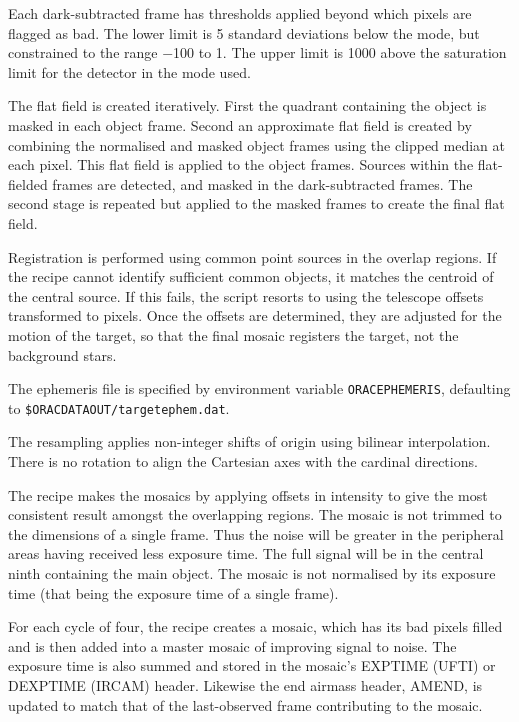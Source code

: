 \documentclass[twoside,11pt]{article}
\renewcommand{\_}{\texttt{\symbol{95}}}
\newcommand{\sstitem}{\item}
\begin{document}
{{{         \sstitem
         Each dark-subtracted frame has thresholds applied beyond which
         pixels are flagged as bad.  The lower limit is 5 standard
         deviations below the mode, but constrained to the range $-$100 to 1.
         The upper limit is 1000 above the saturation limit for the detector
         in the mode used.

         \sstitem
         The flat field is created iteratively.  First the quadrant
         containing the object is masked in each object frame.  Second an
         approximate flat field is created by combining the normalised
         and masked object frames using the clipped median at each pixel.
         This flat field is applied to the object frames.  Sources within
         the flat-fielded frames are detected, and masked in the
         dark-subtracted frames.  The second stage is repeated but applied
         to the masked frames to create the final flat field.

         \sstitem
         Registration is performed using common point sources in the
         overlap regions.  If the recipe cannot identify sufficient common
         objects, it matches the centroid of the central source.  If this
         fails, the script resorts to using the telescope offsets
         transformed to pixels.  Once the offsets are determined, they
         are adjusted for the motion of the target, so that the final
         mosaic registers the target, not the background stars.

         \sstitem
         The ephemeris file is specified by environment variable
         {\tt{ORAC\_EPHEMERIS}}, defaulting to {\tt\$ORAC\_DATA\_OUT/target\_ephem.dat}.

         \sstitem
         The resampling applies non-integer shifts of origin using
         bilinear interpolation.  There is no rotation to align the
         Cartesian axes with the cardinal directions.

         \sstitem
         The recipe makes the mosaics by applying offsets in intensity
         to give the most consistent result amongst the overlapping regions.
         The mosaic is not trimmed to the dimensions of a single frame.  Thus
         the noise will be greater in the peripheral areas having received
         less exposure time.  The full signal will be in the central ninth
         containing the main object.  The mosaic is not normalised by its
         exposure time (that being the exposure time of a single frame).

         \sstitem
         For each cycle of four, the recipe creates a mosaic, which has
         its bad pixels filled and is then added into a master mosaic of
         improving signal to noise.  The exposure time is also summed and
         stored in the mosaic's EXP\_TIME (UFTI) or DEXPTIME (IRCAM) header.
         Likewise the end airmass header, AMEND, is updated to match that of
         the last-observed frame contributing to the mosaic.

}}}
\end{document}
